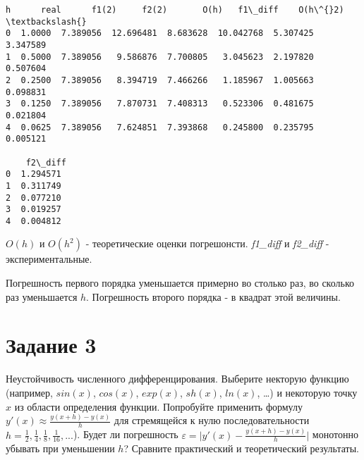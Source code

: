 \documentclass[11pt]{article}
\makeatletter
\newcommand{\boxspacing}{\kern\kvtcb@left@rule\kern\kvtcb@boxsep}
\newcommand{\prompt}[4]{
        {\ttfamily\llap{{\color{#2}[#3]:\hspace{3pt}#4}}\vspace{-\baselineskip}}
    }
\makeatother
\begin{document}
            \begin{tcolorbox}[breakable, size=fbox, boxrule=.5pt, pad at break*=1mm, opacityfill=0]
\prompt{Out}{outcolor}{3}{\boxspacing}
\begin{Verbatim}[commandchars=\\\{\}]
        h      real      f1(2)     f2(2)       O(h)   f1\_diff    O(h\^{}2)  \textbackslash{}
0  1.0000  7.389056  12.696481  8.683628  10.042768  5.307425  3.347589
1  0.5000  7.389056   9.586876  7.700805   3.045623  2.197820  0.507604
2  0.2500  7.389056   8.394719  7.466266   1.185967  1.005663  0.098831
3  0.1250  7.389056   7.870731  7.408313   0.523306  0.481675  0.021804
4  0.0625  7.389056   7.624851  7.393868   0.245800  0.235795  0.005121

    f2\_diff
0  1.294571
1  0.311749
2  0.077210
3  0.019257
4  0.004812
\end{Verbatim}
\end{tcolorbox}
        
    \(O(h)\) и \(O(h^2)\) - теоретические оценки погрешонсти.
\emph{f1\_diff} и \emph{f2\_diff} - экспериментальные.

Погрешность первого порядка уменьшается примерно во столько раз, во
сколько раз уменьшается \(h\). Погрешность второго порядка - в квадрат
этой величины.

    \hypertarget{ux437ux430ux434ux430ux43dux438ux435-3}{%
\section{Задание 3}\label{ux437ux430ux434ux430ux43dux438ux435-3}}

Неустойчивость численного дифференцирования. Выберите некторую функцию
(например, \(sin (x)\), \(cos (x)\), \(exp (x)\), \(sh (x)\),
\(ln (x)\), \ldots) и некоторую точку \(x\) из области определения
функции. Попробуйте применить формулу
\(y'(x) \approx \frac{y(x+h)−y(x)}{h}\) для стремящейся к нулю
последовательности
\(h = \frac{1}{2}, \frac{1}{4}, \frac{1}{8}, \frac{1}{16}, ...\)). Будет
ли погрешность
\(\varepsilon = \lvert y'(x) − \frac{y(x+h)−y(x)}{h} \rvert\) монотонно
убывать при уменьшении \(h\)? Сравните практический и теоретический
результаты.
\end{document}
